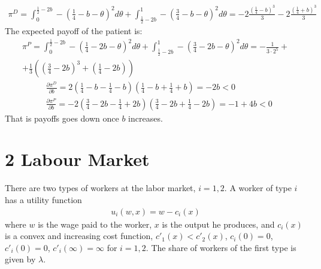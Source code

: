 \documentclass[a4paper]{article}
\begin{document}
\begin{enumerate}
	\begin{align*}
	\pi^D = \int_{0}^{\frac{1}{2} - 2b} - \left(\frac{1}{4} - b - \theta\right)^2d\theta + \int_{\frac{1}{2} - 2b}^{1}- \left(\frac{3}{4} - b - \theta\right)^2d\theta = -2\frac{\left(\frac{1}{4} - b\right)^3}{3} -2\frac{\left(\frac{1}{4} + b\right)^3}{3}
	\end{align*}
	The expected payoff of the patient is:
	\begin{align*}
	\pi^P = \int_{0}^{\frac{1}{2} - 2b} - \left(\frac{1}{4} - 2b - \theta\right)^2d \theta + \int_{\frac{1}{2} - 2b}^1 - \left(\frac{3}{4} - 2b - \theta\right)^2d \theta = -\frac{1}{3 \cdot 2^5} + \\
	+\frac{1}{3} \left(\left(\frac{3}{4} - 2b\right)^3 + \left(\frac{1}{4} - 2b\right)\right)
	\end{align*}
	\begin{align*}
	&\frac{\partial \pi^D}{\partial b} = 2\left(\frac{1}{4} - b - \frac{1}{4} - b\right)\left(\frac{1}{4} - b + \frac{1}{4} + b\right) = -2b < 0\\
	&\frac{\partial \pi^P}{\partial b} = - 2 \left(\frac{3}{4} - 2b - \frac{1}{4} + 2b\right)\left(\frac{3}{4} - 2b + \frac{1}{4} - 2b\right) = -1 + 4b < 0
	\end{align*}
	That is payoffs goes down once $b$ increases.
\end{enumerate}
\section*{ 2 Labour Market}
There are two types of workers at the labor market, $i = 1, 2$. A worker of type $i$ has a utility function
\begin{align*}
u_i(w, x) = w - c_i(x)
\end{align*}
where $w$ is the wage paid to the worker, $x$ is the output he produces, and $c_i(x)$ is a convex
and increasing cost function, $c'_1(x) < c'_2(x)$, $c_i(0) = 0$, $c'_i(0) = 0$, $c'_i(\infty) = \infty$ for $i = 1, 2$.
The share of workers of the first type is given by $\lambda$.
\end{document}
